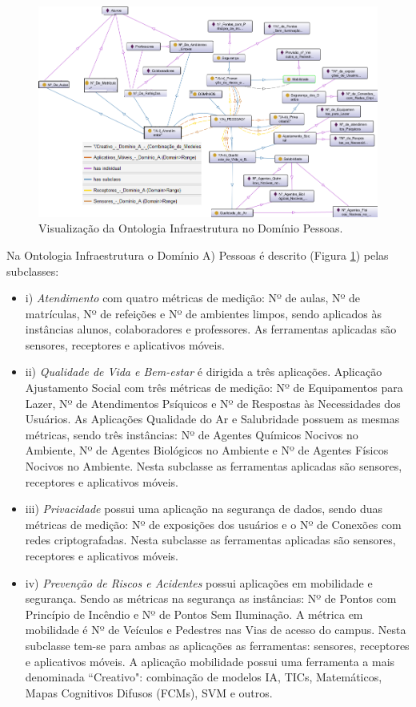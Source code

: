 \documentclass[portuguese]{textolivre}
\begin{document}
\begin{figure}[h!]
    \centering
    \includegraphics[width=0.95\linewidth]{images/FIGURA5.png}
    \caption{Visualização da Ontologia Infraestrutura no Domínio Pessoas.}
    \label{fig-5}
\end{figure}
\bigskip
Na Ontologia Infraestrutura o Domínio A) Pessoas é descrito (Figura \ref{fig-5}) pelas subclasses: 
\medskip
\begin{itemize}
    \item i) \textit{Atendimento} com quatro métricas de medição: Nº de aulas, Nº de matrículas, Nº de refeições e Nº de ambientes limpos, sendo aplicados às instâncias alunos, colaboradores e professores. As ferramentas aplicadas são sensores, receptores e aplicativos móveis.
    \item ii) \textit{Qualidade de Vida e Bem-estar} é dirigida a três aplicações. Aplicação Ajustamento Social com três métricas de medição: Nº de Equipamentos para Lazer, Nº de Atendimentos Psíquicos e Nº de Respostas às Necessidades dos Usuários. As Aplicações Qualidade do Ar e Salubridade possuem as mesmas métricas, sendo três instâncias: Nº de Agentes Químicos Nocivos no Ambiente, Nº de Agentes Biológicos no Ambiente e Nº de Agentes Físicos Nocivos no Ambiente. Nesta subclasse as ferramentas aplicadas são sensores, receptores e aplicativos móveis.
    \item iii) \textit{Privacidade} possui uma aplicação na segurança de dados, sendo duas métricas de medição: Nº de exposições dos usuários e o Nº de Conexões com redes criptografadas. Nesta subclasse as ferramentas aplicadas são sensores, receptores e aplicativos móveis.
    \item iv) \textit{Prevenção de Riscos e Acidentes} possui aplicações em mobilidade e segurança. Sendo as métricas na segurança as instâncias: Nº de Pontos com Princípio de Incêndio e Nº de Pontos Sem Iluminação. A métrica em mobilidade é Nº de Veículos e Pedestres nas Vias de acesso do campus. Nesta subclasse tem-se para ambas as aplicações as ferramentas: sensores, receptores e aplicativos móveis. A aplicação mobilidade possui uma ferramenta a mais denominada ``Creativo": combinação de modelos IA, TICs, Matemáticos, Mapas Cognitivos Difusos (FCMs), SVM e outros.
\end{itemize}
\medskip
\end{document}
